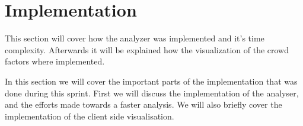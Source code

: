 \section{Implementation}
This section will cover how the analyzer was implemented and it's time complexity. Afterwards it will be explained how the visualization of the crowd factors where implemented.

In this section we will cover the important parts of the implementation that was done during this sprint. First we will discuss the implementation of the analyser, and the efforts made towards a faster analysis. We will also briefly cover the implementation of the client side visualisation.



